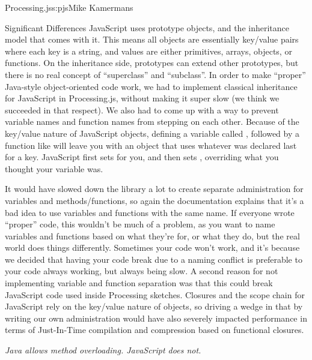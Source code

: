 \begin{aosachapter}{Processing.js}{s:pjs}{Mike Kamermans}
\begin{aosasect1}{Significant Differences}
JavaScript uses prototype objects, and the inheritance model that
comes with it. This means all objects are essentially key/value pairs
where each key is a string, and values are either primitives, arrays,
objects, or functions. On the inheritance side, prototypes can extend
other prototypes, but there is no real concept of ``superclass'' and
``subclass''. In order to make ``proper'' Java-style object-oriented code
work, we had to implement classical inheritance for JavaScript in
Processing.js, without making it super slow (we think we succeeded in
that respect). We also had to come up with a way to prevent variable
names and function names from stepping on each other. Because of the
key/value nature of JavaScript objects, defining a variable called
, followed by a function like  will leave
you with an object that uses whatever was declared last for a
key. JavaScript first sets  for you, and
then sets , overriding what
you thought your variable  was.

It would have slowed down the library a lot to create separate
administration for variables and methods/functions, so again the
documentation explains that it's a bad idea to use variables and
functions with the same name. If everyone wrote ``proper'' code, this
wouldn't be much of a problem, as you want to name variables and
functions based on what they're for, or what they do, but the real
world does things differently. Sometimes your code won't work, and
it's because we decided that having your code break due to a naming
conflict is preferable to your code always working, but always being
slow. A second reason for not implementing variable and function
separation was that this could break JavaScript code used inside
Processing sketches. Closures and the scope chain for JavaScript rely
on the key/value nature of objects, so driving a wedge in that by
writing our own administration would have also severely impacted
performance in terms of Just-In-Time compilation and compression based
on functional closures.

\emph{Java allows method overloading. JavaScript does not.}


\end{aosasect1}
\end{aosachapter}
